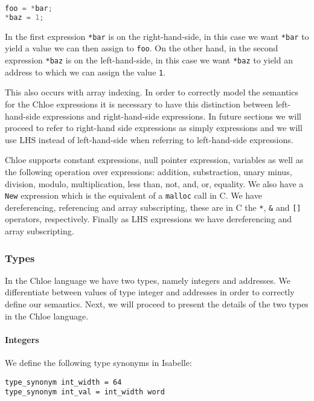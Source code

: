 \begin{lstlisting}[language=C, frame=single]
foo = *bar;
*baz = 1;
\end{lstlisting}

In the first expression \verb|*bar| is on the right-hand-side, in this case we want \verb|*bar| to yield a value we can then assign to \verb|foo|.
On the other hand, in the second expression \verb|*baz| is on the left-hand-side, in this case we want \verb|*baz| to yield an address to which we can assign the value \verb|1|.

This also occurs with array indexing.
In order to correctly model the semantics for the Chloe expressions it is necessary to have this distinction between left-hand-side expressions and right-hand-side expressions.
In future sections we will proceed to refer to right-hand side expressions as simply expressions and we will use LHS instead of left-hand-side when referring to left-hand-side expressions.

Chloe supports constant expressions, null pointer expression, variables as well as the following operation over expressions: addition, substraction, unary minus, division, modulo, multiplication, less than, not, and, or, equality.
We also have a \verb|New| expression which is the equivalent of a \verb|malloc| call in C.
We have dereferencing, referencing and array subscripting, these are in C the \verb|*|, \verb|&| and \verb|[]| operators, respectively.
Finally as LHS expressions we have dereferencing and array subscripting.

\subsubsection{Types}

In the Chloe language we have two types, namely integers and addresses.
We differentiate between values of type integer and addresses in order to correctly define our semantics.
Next, we will proceed to present the details of the two types in the Chloe language.

\paragraph{Integers}

We define the following type synonyms in Isabelle:

\begin{lstlisting}[frame=single]
type_synonym int_width = 64
type_synonym int_val = int_width word
\end{lstlisting}


